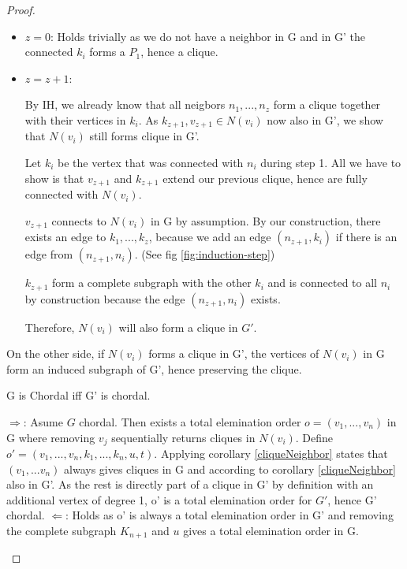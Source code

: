 \begin{proof}
\begin{subproof}
        \begin{itemize}
            \item $z = 0$: Holds trivially as we do not have a neighbor in G and in G' the connected $k_i$ forms a $P_1$, hence a clique.
            \item $z = z + 1$: 

            By IH, we already know that all neigbors $n_1,...,n_z$ form a clique together with their vertices in $k_{i}$. As $k_{z+1}, v_{z+1} \in N(v_i)$ now also in G', we show that $N(v_i)$ still forms clique in G'.

            Let $k_i$ be the vertex that was connected with $n_i$ during step 1. All we have to show is that $v_{z+1}$ and $k_{z+1}$ extend our previous clique, hence are fully connected with $N(v_i)$.
            
            $v_{z+1}$ connects to $N(v_i)$ in G by assumption. By our construction, there exists an edge to $k_1,...,k_z$, because we add an edge $(n_{z+1}, k_i)$ if there is an edge from $(n_{z+1}, n_i)$. (See fig \ref{fig:induction-step})

            $k_{z+1}$ form a complete subgraph with the other $k_i$ and is connected to all $n_i$ by construction because the edge $(n_{z+1},n_i)$ exists.  


            Therefore, $N(v_i)$ will also form a clique in $G'$.
        \end{itemize}

        On the other side, if $N(v_i)$ forms a clique in G', the vertices of $N(v_i)$ in G form an induced subgraph of G', hence preserving the clique.
        
    \end{subproof}
   
    \begin{corollary}
    G is Chordal iff G' is chordal.    
    \end{corollary}
    \begin{subproof}
    $\Rightarrow$: Asume $G$ chordal. Then exists a total elemination order $o = (v_1, ..., v_n)$ in G where removing $v_j$ sequentially returns cliques in $N(v_i)$.
    Define $o' = (v_1, ..., v_n, k_1, ..., k_n, u, t)$. Applying corollary \ref*{cliqueNeighbor} states that $(v_1, ... v_n)$ always gives cliques in G and according to corollary \ref*{cliqueNeighbor} also in G'. As the rest is directly part of a clique in G' by definition with an additional vertex of degree 1, o' is a total elemination order for $G'$, hence G' chordal.
    $\Leftarrow$: Holds as o' is always a total elemination order in G' and removing  the complete subgraph $K_{n+1}$ and $u$ gives a total elemination order in G.
    \end{subproof}



\end{proof}
